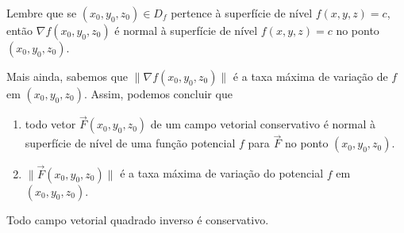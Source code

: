 \begin{remark}
    Lembre que se \((x_0,y_0,z_0)\in D_f\) pertence à superfície de nível \(f(x,y,z) = c\), então \(\nabla f(x_0,y_0,z_0)\) é normal à superfície de nível \(f(x,y,z) = c\) no ponto \((x_0,y_0,z_0)\).

    Mais ainda, sabemos que \(\|\nabla f(x_0,y_0,z_0)\|\) é a taxa máxima de variação de \(f\) em \((x_0,y_0,z_0)\). Assim, podemos concluir que 
        \begin{enumerate}
            \item todo vetor \(\overrightarrow{F}(x_0,y_0,z_0)\) de um campo vetorial conservativo é normal à superfície de nível de uma função potencial \(f\) para \(\overrightarrow{F}\) no ponto \((x_0,y_0,z_0)\).
            \item \(\|\overrightarrow{F}(x_0,y_0,z_0)\|\) é a taxa máxima de variação do potencial \(f\) em \((x_0,y_0,z_0)\).
        \end{enumerate}
\end{remark}

\begin{theorem}
    Todo campo vetorial quadrado inverso é conservativo.
\end{theorem}

